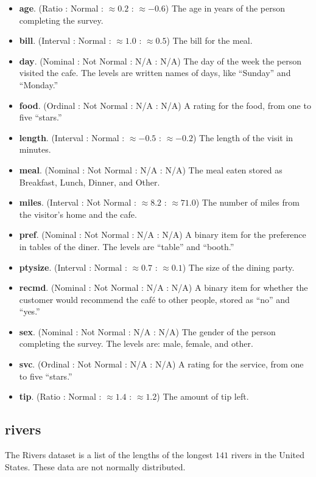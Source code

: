 \begin{itemize}
  \item \textbf{age}. (Ratio : Normal : $ \approx 0.2 $ : $ \approx -0.6 $) The age in years of the person completing the survey.
  \item \textbf{bill}. (Interval : Normal : $ \approx 1.0 $ : $ \approx 0.5 $) The bill for the meal.
  \item \textbf{day}. (Nominal : Not Normal : N/A : N/A) The day of the week the person visited the cafe. The levels are written names of days, like ``Sunday'' and ``Monday.''
  \item \textbf{food}. (Ordinal : Not Normal : N/A : N/A) A rating for the food, from one to five ``stars.''
  \item \textbf{length}. (Interval : Normal : $ \approx -0.5 $ : $ \approx -0.2 $) The length of the visit in minutes.
  \item \textbf{meal}. (Nominal : Not Normal : N/A : N/A) The meal eaten stored as Breakfast, Lunch, Dinner, and Other.
  \item \textbf{miles}. (Interval : Not Normal : $ \approx 8.2 $ : $ \approx 71.0 $) The number of miles from the visitor's home and the cafe.
  \item \textbf{pref}. (Nominal : Not Normal : N/A : N/A) A binary item for the preference in tables of the diner. The levels are ``table'' and ``booth.''
  \item \textbf{ptysize}. (Interval : Normal : $ \approx 0.7 $ : $ \approx 0.1 $) The size of the dining party.
  \item \textbf{recmd}. (Nominal : Not Normal : N/A : N/A) A binary item for whether the customer would recommend the caf\'{e} to other people, stored as ``no'' and ``yes.''   
  \item \textbf{sex}. (Nominal : Not Normal : N/A : N/A) The gender of the person completing the survey. The levels are: male, female, and other. 
  \item \textbf{svc}.  (Ordinal : Not Normal : N/A : N/A) A rating for the service, from one to five ``stars.''
  \item \textbf{tip}. (Ratio : Normal : $ \approx 1.4 $ : $ \approx 1.2 $) The amount of tip left.
\end{itemize}

\subsection{rivers}

The Rivers dataset is a list of the lengths of the longest $ 141 $ rivers in the United States. These data are not normally distributed.

